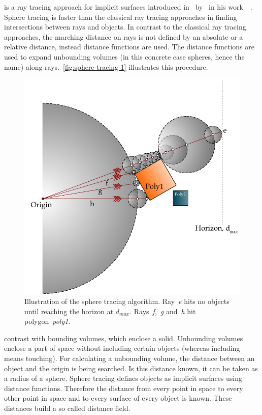 \documentclass[%
    a4paper,    %
    justified,  %
    nobib,      %
    openany     %
]{tufte-book}
\begin{document}
 is a ray tracing approach for implicit surfaces
introduced in~\citeyear{hart_sphere_1994} by~\citeauthor{hart_sphere_1994} in
his work~~\cite{hart_sphere_1994}. 
Sphere tracing is faster than the classical ray tracing approaches in finding
intersections between rays and objects. In contrast to the classical ray tracing
approaches, the marching distance on rays is not defined by an absolute or a
relative distance, instead distance functions are used. The distance functions
are used to expand unbounding volumes (in this concrete case spheres, hence the
name) along rays.~\autoref{fig:sphere-tracing-1} illustrates this procedure.

\begin{figure}[h]
    \centering
    \includegraphics[width=0.75\linewidth]{images/sphere-tracing-principle}
    \caption{Illustration of the sphere tracing
      algorithm.
      Ray~\textit{e} hits no objects until reaching the horizon at
      $d_{max}$. Rays~\textit{f},~\textit{g} and~\textit{h} hit
      polygon~\textit{poly1}.}
      \label{fig:sphere-tracing-1}
\end{figure}

 contrast with bounding volumes, which enclose a
solid. Unbounding volumes enclose a part of space without including certain
objects (whereas including means touching). For calculating a unbounding volume,
the distance between an object and the origin is being searched. Is this
distance known, it can be taken as a radius of a sphere. Sphere tracing defines
objects as implicit surfaces using distance functions. Therefore the distance
from every point in space to every other point in space and to every surface of
every object is known. These distances build a so called distance field.
\end{document}
